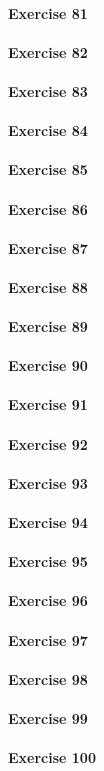 \paragraph{Exercise 81}
\paragraph{Exercise 82}
\paragraph{Exercise 83}
\paragraph{Exercise 84}
\paragraph{Exercise 85}
\paragraph{Exercise 86}
\paragraph{Exercise 87}
\paragraph{Exercise 88}
\paragraph{Exercise 89}
\paragraph{Exercise 90}
\paragraph{Exercise 91}
\paragraph{Exercise 92}
\paragraph{Exercise 93}
\paragraph{Exercise 94}
\paragraph{Exercise 95}
\paragraph{Exercise 96}
\paragraph{Exercise 97}
\paragraph{Exercise 98}
\paragraph{Exercise 99}
\paragraph{Exercise 100}